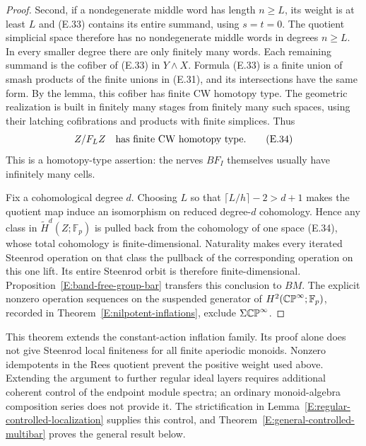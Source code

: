 \begin{proof}
Second, if a nondegenerate middle word has length $n\geq L$, its
weight is at least $L$ and (E.33) contains its entire summand, using
$s=t=0$.  The quotient simplicial space therefore has no
nondegenerate middle words in degrees $n\geq L$.  In every smaller
degree there are only finitely many words.  Each remaining summand
is the cofiber of (E.33) in $Y\wedge X$.  Formula (E.33) is a finite
union of smash products of the finite unions in (E.31), and its
intersections have the same form.  By the lemma, this cofiber has
finite CW homotopy type.  The geometric realization is built in
finitely many stages from finitely many such spaces, using their
latching cofibrations and products with finite simplices.  Thus
\[
 Z/F_LZ\quad\hbox{has finite CW homotopy type}.          \tag{E.34}
\]
This is a homotopy-type assertion: the nerves $BF_I$ themselves
usually have infinitely many cells.

Fix a cohomological degree $d$.  Choosing $L$ so that
$\lceil L/h\rceil-2>d+1$ makes the quotient map induce an
isomorphism on reduced degree-$d$ cohomology.  Hence any class in
$\widetilde H^d(Z;\mathbb F_p)$ is pulled back from the cohomology
of one space (E.34), whose total cohomology is finite-dimensional.
Naturality makes every iterated Steenrod operation on that class
the pullback of the corresponding operation on this one lift.
Its entire Steenrod orbit is therefore finite-dimensional.
Proposition~\ref{E:band-free-group-bar} transfers this conclusion
to $BM$.  The explicit nonzero operation sequences on the suspended
generator of $H^2(\mathbb {CP}^\infty;\mathbb F_p)$, recorded in
Theorem~\ref{E:nilpotent-inflations}, exclude $\Sigma\mathbb {CP}^\infty$.
\end{proof}

\begin{remark}\label{E:nilpotent-Rees-scope}
This theorem extends the constant-action inflation family.  Its proof
alone does not give Steenrod local finiteness for all finite aperiodic monoids.
Nonzero idempotents in the Rees quotient prevent the positive weight
used above.  Extending the argument to further regular ideal layers
requires additional coherent control of the endpoint module spectra;
an ordinary monoid-algebra composition series does not provide it.
The strictification in
Lemma~\ref{E:regular-controlled-localization} supplies this control,
and Theorem~\ref{E:general-controlled-multibar} proves the general
result below.
\end{remark}

